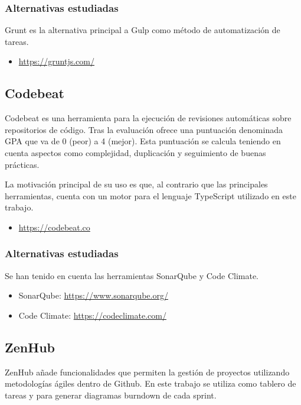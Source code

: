 \subsubsection{Alternativas estudiadas}

Grunt es la alternativa principal a Gulp como método de automatización de tareas.

\begin{itemize}
	\item \url{https://gruntjs.com/}
\end{itemize}

\subsection{Codebeat}

Codebeat es una herramienta para la ejecución de revisiones automáticas sobre repositorios de código. Tras la evaluación ofrece una puntuación denominada GPA que va de 0 (peor) a 4 (mejor). Esta puntuación se calcula teniendo en cuenta aspectos como complejidad, duplicación y seguimiento de buenas prácticas.

La motivación principal de su uso es que, al contrario que las principales herramientas, cuenta con un motor para el lenguaje TypeScript utilizado en este trabajo.

\begin{itemize}
	\item \url{https://codebeat.co}
\end{itemize}

\subsubsection{Alternativas estudiadas}

Se han tenido en cuenta las herramientas SonarQube y Code Climate.
\begin{itemize}
	\item SonarQube: \url{https://www.sonarqube.org/}
	\item Code Climate: \url{https://codeclimate.com/}
\end{itemize}

\subsection{ZenHub}

ZenHub añade funcionalidades que permiten la gestión de proyectos utilizando metodologías ágiles dentro de Github. En este trabajo se utiliza como tablero de tareas y para generar diagramas burndown de cada sprint.

